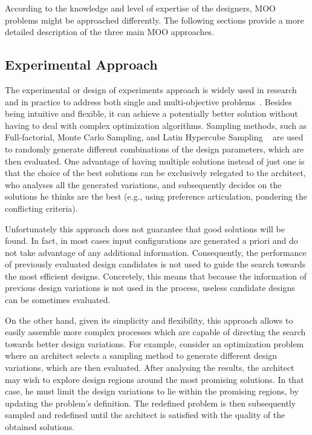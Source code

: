 	According to the knowledge and level of expertise of the designers, \ac{MOO} problems might be approached differently. The following sections provide a more detailed description of the three main \ac{MOO} approaches.


\subsection{Experimental Approach}

	The experimental or design of experiments approach is widely used in research and in practice to address both single and multi-objective problems~\cite{Fang2017}. Besides being intuitive and flexible, it can achieve a potentially better solution without having to deal with complex optimization algorithms. Sampling methods, such as Full-factorial, Monte Carlo Sampling, and Latin Hypercube Sampling ~\cite{Giunta2003DOE} are used to randomly generate different combinations of the design parameters, which are then evaluated. One advantage of having multiple solutions instead of just one is that the choice of the best solutions can be exclusively relegated to the architect, who analyses all the generated variations, and subsequently decides on the solutions he
thinks are the best (e.g., using preference articulation, pondering the conflicting criteria).

	Unfortunately this approach does not guarantee that good solutions will be found. In fact, in most cases input configurations are generated a priori and do not take advantage of any additional information. Consequently, the performance of previously evaluated design candidates is not used to guide the search towards the most efficient designs. Concretely, this means that because the information of previous design variations is not used in the process, useless candidate designs can be sometimes evaluated.
	
	On the other hand, given its simplicity and flexibility, this approach allows to easily assemble more complex processes which are capable of directing the search towards better design variations. For example, consider an optimization problem where an architect selects a sampling method to generate different design variations, which are then evaluated. After analysing the results, the architect may wish to explore design regions around the most promising solutions. In that case, he must limit the design variations to lie within the promising regions, by updating the problem’s definition. The redefined problem is then subsequently sampled and redefined until the architect is satisfied with the quality of the obtained solutions.
	
